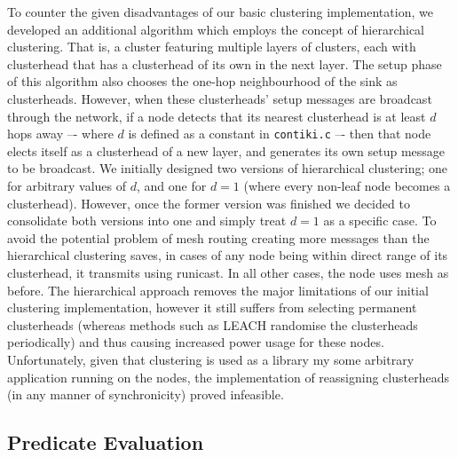 To counter the given disadvantages of our basic clustering implementation, we developed an additional algorithm which employs the concept of hierarchical clustering. That is, a cluster featuring multiple layers of clusters, each with  clusterhead that has a clusterhead of its own in the next layer. The setup phase of this algorithm also chooses the one-hop neighbourhood of the sink as clusterheads. However, when these clusterheads' setup messages are broadcast through the network, if a node detects that its nearest clusterhead is at least $d$ hops away –- where $d$ is defined as a constant in \verb|contiki.c| –- then that node elects itself as a clusterhead of a new layer, and generates its own setup message to be broadcast. We initially designed two versions of hierarchical clustering; one for arbitrary values of $d$, and one for $d=1$ (where every non-leaf node becomes a clusterhead). However, once the former version was finished we decided to consolidate both versions into one and simply treat $d=1$ as a specific case. To avoid the potential problem of mesh routing creating more messages than the hierarchical clustering saves, in cases of any node being within direct range of its clusterhead, it transmits using runicast. In all other cases, the node uses mesh as before. The hierarchical approach removes the major limitations of our initial clustering implementation, however it still suffers from selecting permanent clusterheads (whereas methods such as LEACH randomise the clusterheads periodically) and thus causing increased power usage for these nodes. Unfortunately, given that clustering is used as a library my some arbitrary application running on the nodes, the implementation of reassigning clusterheads (in any manner of synchronicity) proved infeasible.

\subsection{Predicate Evaluation}

